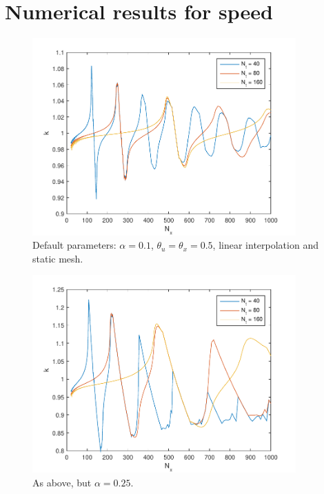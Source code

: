 \documentclass{article}
\begin{document}
\section{Numerical results for speed}

\begin{figure}[htbp]
\centering
  \includegraphics[width=0.9\textwidth]{alan0-k.pdf}
  \caption{Default parameters: $\alpha = 0.1$, $\theta_u = \theta_x = 0.5$,
  linear interpolation and static mesh.
  \label{fig:alan0-k}}
\end{figure}
\begin{figure}[hbtp]
\centering
  \includegraphics[width=0.9\textwidth]{alan1-k.pdf}
  \caption{As above, but $\alpha = 0.25$.
  \label{fig:alan1-k}}
\end{figure}
\end{document}
